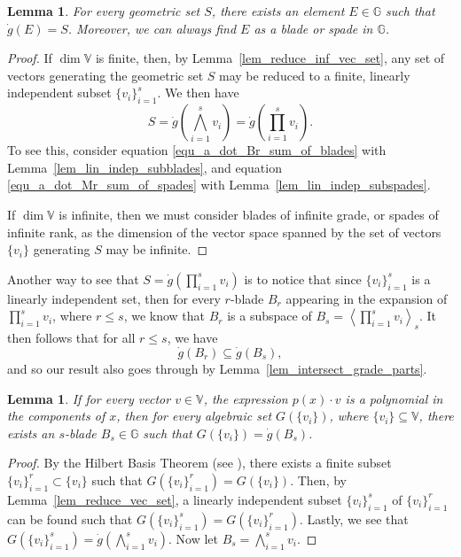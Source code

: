 \documentclass{birkjour}
\newtheorem{lem}[thm]{Lemma}
\theoremstyle{definition}
\theoremstyle{remark}
\numberwithin{equation}{section}
\newcommand{\G}{\mathbb{G}}
\newcommand{\V}{\mathbb{V}}
\newcommand{\gd}{\dot{g}}
\begin{document}
\begin{lem}\label{lem_all_geo_sets_rep_by_blades_or_spades}
For every geometric set $S$, there exists an element $E\in\G$ such that $\gd(E)=S$.
Moreover, we can always find $E$ as a blade or spade in $\G$.
\end{lem}
\begin{proof}
If $\dim\V$ is finite, then, by Lemma~\ref{lem_reduce_inf_vec_set}, any set of vectors generating the geometric
set $S$ may be reduced to a finite, linearly independent subset $\{v_i\}_{i=1}^s$.
We then have
\begin{equation*}
S=\gd\left(\bigwedge_{i=1}^s v_i\right) = \gd\left(\prod_{i=1}^s v_i\right).
\end{equation*}
To see this, consider equation \eqref{equ_a_dot_Br_sum_of_blades} with Lemma~\ref{lem_lin_indep_subblades},
and equation \eqref{equ_a_dot_Mr_sum_of_spades} with Lemma~\ref{lem_lin_indep_subspades}.

If $\dim\V$ is infinite, then we must consider blades of infinite grade, or spades of infinite rank, as the dimension
of the vector space spanned by the set of vectors $\{v_i\}$ generating $S$ may be infinite.
\end{proof}

Another way to see that $S=\gd(\prod_{i=1}^s v_i)$ is to notice that
since $\{v_i\}_{i=1}^s$
is a linearly independent set, then for every $r$-blade $B_r$ appearing in the expansion of $\prod_{i=1}^s v_i$,
where $r\leq s$, we know that $B_r$ is a subspace of $B_s=\left\langle\prod_{i=1}^s v_i\right\rangle_s$.  It then follows that
for all $r\leq s$, we have
\begin{equation*}
\gd\left(B_r\right)\subseteq\gd\left(B_s\right),
\end{equation*}
and so our result also goes through by Lemma~\ref{lem_intersect_grade_parts}.

\begin{lem}
If for every vector $v\in\V$, the expression $p(x)\cdot v$ is a polynomial in the components of $x$,
then for every algebraic set $G(\{v_i\})$, where $\{v_i\}\subseteq\V$, there exists an $s$-blade $B_s\in\G$ such that
$G(\{v_i\})=\gd(B_s)$.
\end{lem}
\begin{proof}
By the Hilbert Basis Theorem (see \cite[p. 204]{Garrity13}), there exists a finite subset $\{v_i\}_{i=1}^r\subset\{v_i\}$
such that $G(\{v_i\}_{i=1}^r)=G(\{v_i\})$.  Then, by Lemma~\ref{lem_reduce_vec_set}, a linearly independent subset $\{v_i\}_{i=1}^s$
of $\{v_i\}_{i=1}^r$ can be found such that $G(\{v_i\}_{i=1}^s)=G(\{v_i\}_{i=1}^r)$.
Lastly, we see that $G(\{v_i\}_{i=1}^s)=\gd(\bigwedge_{i=1}^s v_i)$.  Now let $B_s=\bigwedge_{i=1}^s v_i$.
\end{proof}
\end{document}
